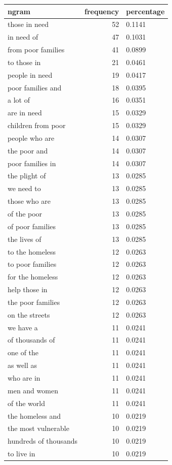 \begin{tabular}{lrl}
\toprule
ngram & frequency & percentage \\
\midrule
those in need & 52 & 0.1141 \\
in need of & 47 & 0.1031 \\
from poor families & 41 & 0.0899 \\
to those in & 21 & 0.0461 \\
people in need & 19 & 0.0417 \\
poor families and & 18 & 0.0395 \\
a lot of & 16 & 0.0351 \\
are in need & 15 & 0.0329 \\
children from poor & 15 & 0.0329 \\
people who are & 14 & 0.0307 \\
the poor and & 14 & 0.0307 \\
poor families in & 14 & 0.0307 \\
the plight of & 13 & 0.0285 \\
we need to & 13 & 0.0285 \\
those who are & 13 & 0.0285 \\
of the poor & 13 & 0.0285 \\
of poor families & 13 & 0.0285 \\
the lives of & 13 & 0.0285 \\
to the homeless & 12 & 0.0263 \\
to poor families & 12 & 0.0263 \\
for the homeless & 12 & 0.0263 \\
help those in & 12 & 0.0263 \\
the poor families & 12 & 0.0263 \\
on the streets & 12 & 0.0263 \\
we have a & 11 & 0.0241 \\
of thousands of & 11 & 0.0241 \\
one of the & 11 & 0.0241 \\
as well as & 11 & 0.0241 \\
who are in & 11 & 0.0241 \\
men and women & 11 & 0.0241 \\
of the world & 11 & 0.0241 \\
the homeless and & 10 & 0.0219 \\
the most vulnerable & 10 & 0.0219 \\
hundreds of thousands & 10 & 0.0219 \\
to live in & 10 & 0.0219 \\

\end{tabular}
